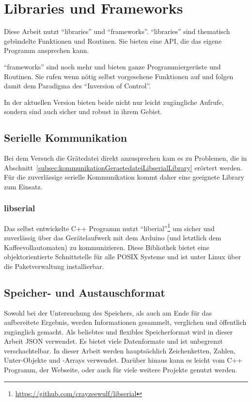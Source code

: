 \section{Libraries und Frameworks}
Diese Arbeit nutzt "`libraries"' und "`frameworks"'.
"`libraries"' sind thematisch gebündelte Funktionen und Routinen. Sie bieten eine \ac{API}, die das eigene Programm ansprechen kann.

"`frameworks"' sind noch mehr und bieten ganze Programmiergerüste und Routinen. Sie rufen wenn nötig selbst vorgesehene Funktionen auf und folgen damit dem Paradigma des "`Inversion of Control"'.

In der aktuellen Version bieten beide nicht nur leicht zugängliche Aufrufe, sondern sind auch sicher und robust in ihrem Gebiet.

\subsection{Serielle Kommunikation}
Bei dem Versuch die Grätedatei direkt anzusprechen kam es zu Problemen, die in Abschnitt~\ref{subsec:kommunikationGeraetedateiLibserialLibrary} erörtert werden. Für die zuverlässige serielle Kommunikation kommt daher eine geeignete Library zum Einsatz.

\subsubsection{libserial}
Das selbst entwickelte C++ Programm nutzt "`liberial"'\footnote{\url{https://github.com/crayzeewulf/libserial}} um sicher und zuverlässig über das Gerätelaufwerk mit dem Arduino (und letztlich dem Kaffeevollautomaten) zu kommunizieren.
Diese Bibliothek bietet eine objektorientierte Schnittstelle für alle \ac{POSIX} Systeme und ist unter Linux über die Paketverwaltung installierbar.

\subsection{Speicher- und Austauschformat}
Sowohl bei der Untersuchung des Speichers, als auch am Ende für das aufbereitete Ergebnis, werden Informationen gesammelt, verglichen und öffentlich zugänglich gemacht.
Als beliebtes und flexibles Speicherformat wird in dieser Arbeit \ac{JSON} verwendet.
Es bietet viele Datenformate und ist unbegrenzt verschachtelbar.
In dieser Arbeit werden hauptsächlich Zeichenketten, Zahlen, Unter-Objekte und -Arrays verwendet.
Darüber hinaus kann es leicht vom C++ Programm, der Webseite, oder auch für viele weitere Projekte genutzt werden.


